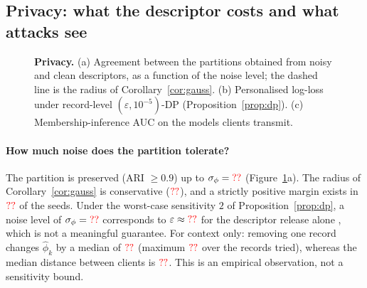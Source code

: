 \subsection{Privacy: what the descriptor costs and what attacks see}
\label{sec:e_privacy}

\begin{figure}[t]
\centering
{}
\caption{\textbf{Privacy.} (a) Agreement between the partitions obtained from noisy and
clean descriptors, as a function of the noise level; the dashed line is the radius of
Corollary~\ref{cor:gauss}. (b) Personalised log-loss under record-level
$(\varepsilon,10^{-5})$-DP (Proposition~\ref{prop:dp}). (c) Membership-inference AUC on the
models clients transmit.}
\label{fig:privacy}
\end{figure}

\paragraph{How much noise does the partition tolerate?}
The partition is preserved (ARI $\ge0.9$) up to $\sigma_\phi=\textcolor{red}{??}$
(Figure~\ref{fig:privacy}a). The radius of Corollary~\ref{cor:gauss} is conservative
($\textcolor{red}{??}$), and a strictly positive margin exists in $\textcolor{red}{??}$ of the seeds. Under
the worst-case sensitivity $2$ of Proposition~\ref{prop:dp}, a noise level of
$\sigma_\phi=\textcolor{red}{??}$ corresponds to $\varepsilon\approx\textcolor{red}{??}$ for the descriptor
release alone \citep[analytic Gaussian mechanism,][]{balle2018improving}, which is not a
meaningful guarantee. For context only: removing one record changes $\hat\phi_k$ by a median
of $\textcolor{red}{??}$ (maximum $\textcolor{red}{??}$ over the records tried), whereas the median distance
between clients is $\textcolor{red}{??}$. This is an empirical observation, not a sensitivity bound.

